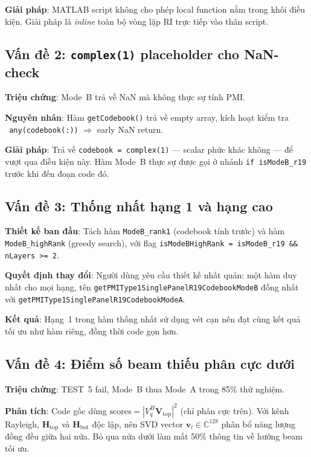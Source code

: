 \documentclass[11pt,a4paper]{article}
\begin{document}
\noindent\textbf{Giải pháp}: MATLAB script không cho phép local function
nằm trong khối điều kiện. Giải pháp là \emph{inline} toàn bộ vòng lặp RI
trực tiếp vào thân script.

\subsection{Vấn đề 2: \texttt{complex(1)} placeholder cho NaN-check}

\noindent\textbf{Triệu chứng}: Mode~B trả về NaN mà không thực sự tính PMI.

\noindent\textbf{Nguyên nhân}: Hàm \texttt{getCodebook()} trả về empty array,
kích hoạt kiểm tra \texttt{~any(codebook(:))} $\Rightarrow$ early NaN return.

\noindent\textbf{Giải pháp}: Trả về \texttt{codebook = complex(1)} --- scalar
phức khác không --- để vượt qua điều kiện này. Hàm Mode~B thực sự
được gọi ở nhánh \texttt{if isModeB\_r19} trước khi đến đoạn code đó.

\subsection{Vấn đề 3: Thống nhất hạng 1 và hạng cao}

\noindent\textbf{Thiết kế ban đầu}: Tách hàm \texttt{ModeB\_rank1} (codebook
tính trước) và hàm \texttt{ModeB\_highRank} (greedy search), với
flag \texttt{isModeBHighRank = isModeB\_r19 \&\& nLayers >= 2}.

\noindent\textbf{Quyết định thay đổi}: Người dùng yêu cầu thiết kế nhất quán:
một hàm duy nhất cho mọi hạng, tên \texttt{getPMIType1SinglePanelR19CodebookModeB}
đồng nhất với \texttt{getPMIType1SinglePanelR19CodebookModeA}.

\noindent\textbf{Kết quả}: Hạng~1 trong hàm thống nhất sử dụng vét cạn nên
đạt cùng kết quả tối ưu như hàm riêng, đồng thời code gọn hơn.

\subsection{Vấn đề 4: Điểm số beam thiếu phân cực dưới}

\noindent\textbf{Triệu chứng}: TEST~5 fail, Mode~B thua Mode~A trong 85\% thử nghiệm.

\noindent\textbf{Phân tích}: Code gốc dùng
$\text{scores} = |V_q^H \mathbf{V}_\text{top}|^2$ (chỉ phân cực trên).
Với kênh Rayleigh, $\mathbf{H}_\text{top}$ và $\mathbf{H}_\text{bot}$
độc lập, nên SVD vector $\mathbf{v}_l \in \mathbb{C}^{128}$ phân bổ
năng lượng đồng đều giữa hai nửa. Bỏ qua nửa dưới làm mất 50\% thông tin
về hướng beam tối ưu.
\end{document}
